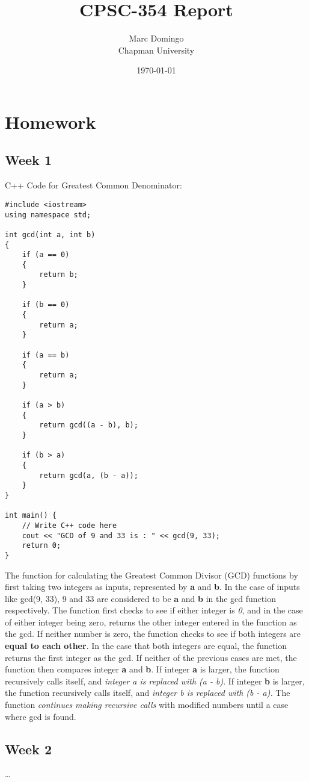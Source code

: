 \documentclass{article}
\title{CPSC-354 Report}
\author{Marc Domingo  \\ Chapman University}
\date{\today}
\theoremstyle{theorem}
\theoremstyle{definition}
\theoremstyle{remark}
\begin{document}
\maketitle
\section{Homework}\label{homework}
\subsection{Week 1}

C++ Code for Greatest Common Denominator:
\begin{lstlisting}
#include <iostream>
using namespace std;

int gcd(int a, int b)
{
    if (a == 0)
    {
        return b;
    }
    
    if (b == 0)
    {
        return a;
    }
    
    if (a == b)
    {
        return a;
    }
    
    if (a > b)
    {
        return gcd((a - b), b);
    }
    
    if (b > a)
    {
        return gcd(a, (b - a));
    }
}

int main() {
    // Write C++ code here
    cout << "GCD of 9 and 33 is : " << gcd(9, 33);
    return 0;
}
\end{lstlisting}
    
    The function for calculating the Greatest Common Divisor (GCD) functions by first taking two integers as inputs, represented by \textbf{a} and \textbf{b}. In the case of inputs like gcd(9, 33), 9 and 33 are considered to be \textbf{a} and \textbf{b} in the gcd function respectively. The function first checks to see if either integer is \textit{0}, and in the case of either integer being zero, returns the other integer entered in the function as the gcd. If neither number is zero, the function checks to see if both integers are \textbf{equal to each other}. In the case that both integers are equal, the function returns the first integer as the gcd. If neither of the previous cases are met, the function then compares integer \textbf{a} and \textbf{b}. If integer \textbf{a} is larger, the function recursively calls itself, and \textit{integer a is replaced with (a - b)}. If integer \textbf{b} is larger, the function recursively calls itself, and \textit{integer b is replaced with (b - a).} The function \textit{continues making recursive calls} with modified numbers until a case where gcd is found.

\subsection{Week 2}

\ldots
\end{document}
